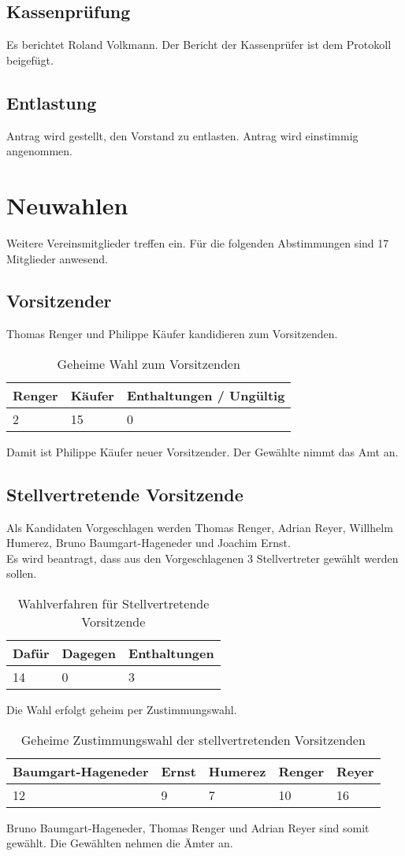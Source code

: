 \documentclass[a4paper]{scrartcl}
\begin{document}
\subsection{Kassenprüfung}
Es berichtet Roland Volkmann. Der Bericht der Kassenprüfer ist dem Protokoll beigefügt.
\subsection{Entlastung}
Antrag wird gestellt, den Vorstand zu entlasten. Antrag wird einstimmig angenommen.

\section{Neuwahlen}

Weitere Vereinsmitglieder treffen ein. Für die folgenden Abstimmungen sind 17 Mitglieder anwesend.

\subsection{Vorsitzender}
Thomas Renger und Philippe Käufer kandidieren zum Vorsitzenden.
\begin{table}[H]
	\begin{tabularx}{\textwidth}{XXX}
		Renger & Käufer & Enthaltungen / Ungültig\\
		\toprule
		2 & 15 & 0\\
	\end{tabularx}
	\caption{Geheime Wahl zum Vorsitzenden}
\end{table}
Damit ist Philippe Käufer neuer Vorsitzender. Der Gewählte nimmt das Amt an.

\subsection{Stellvertretende Vorsitzende}
Als Kandidaten Vorgeschlagen werden Thomas Renger, Adrian Reyer, Willhelm Humerez, Bruno Baumgart-Hageneder und Joachim Ernst.\\
Es wird beantragt, dass aus den Vorgeschlagenen 3 Stellvertreter gewählt werden sollen.
\begin{table}[H]
	\begin{tabularx}{\textwidth}{XXX}
		Dafür & Dagegen & Enthaltungen\\
		\toprule
		14 & 0 & 3\\
	\end{tabularx}
	\caption{Wahlverfahren für Stellvertretende Vorsitzende}
\end{table}
Die Wahl erfolgt geheim per Zustimmungswahl.\\
\begin{table}[H]
	\begin{tabularx}{\textwidth}{XXXXX}
		Baumgart-Hageneder & Ernst & Humerez & Renger & Reyer\\
		\toprule
		12 & 9 & 7 & 10 & 16\\
	\end{tabularx}
	\caption{Geheime Zustimmungswahl der stellvertretenden Vorsitzenden}
\end{table}
Bruno Baumgart-Hageneder, Thomas Renger und Adrian Reyer sind somit gewählt. Die Gewählten nehmen die Ämter an.
\end{document}
